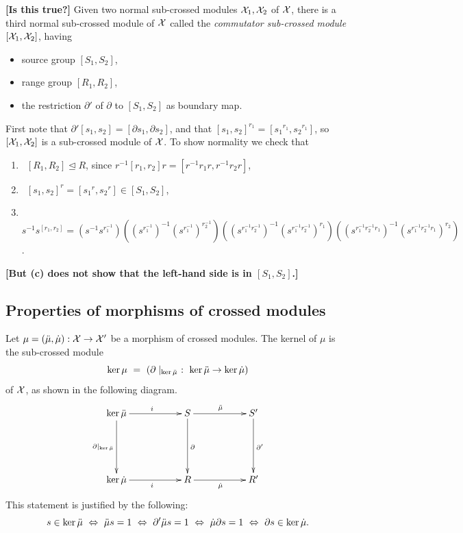 \begin{prop}
{\bf [Is this true?]}\quad
Given two normal sub-crossed modules $\mathcal{X}_1, \mathcal{X}_2$ of $\mathcal{X}$, 
there is a third normal sub-crossed module of $\mathcal{X}$ 
called the \emph{commutator sub-crossed module} 
$[\mathcal{X}_1,\mathcal{X}_2]$, having
\begin{itemize}
\item source group $[S_1,S_2]$,
\item range group $[R_1,R_2]$,
\item the restriction $\partial'$ of $\partial$ to $[S_1,S_2]$ 
as boundary map. 
\end{itemize}
\end{prop}
\begin{pf}
First note that $\partial'[s_1,s_2] = [\partial s_1, \partial s_2]$, 
and that $[s_1,s_2]^{r_1} = [{s_1}^{r_1}, {s_2}^{r_1}]$, 
so $[\mathcal{X}_1,\mathcal{X}_2]$ is a sub-crossed module of $\mathcal{X}$.
To show normality we check that
\begin{enumerate}[{\rm (a)}]
\item ~$[R_1,R_2] \unlhd R$, 
since $r^{-1}[r_1,r_2]r = [r^{-1}r_1r,r^{-1}r_2r]$, 
\item ~$[s_1,s_2]^r = [{s_1}^r,{s_2}^r] \in [S_1,S_2]$,
\item ~$s^{-1}s^{[r_1,r_2]} 
  = (s^{-1}s^{r_1^{-1}})
    ((s^{r_1^{-1}})^{-1}(s^{r_1^{-1}})^{r_2^{-1}})
    ((s^{r_1^{-1}r_2^{-1}})^{-1}(s^{r_1^{-1}r_2^{-1}})^{r_1})
    ((s^{r_1^{-1}r_2^{-1}r_1})^{-1}(s^{r_1^{-1}r_2^{-1}r_1})^{r_2})$.
\end{enumerate}
{\bf [But (c) does not show that the left-hand side is in $[S_1,S_2]$.]}
\end{pf}



\subsection{Properties of morphisms of crossed modules} 
\label{subs:mor-props}

Let $\mu = (\ddot{\mu},\dot{\mu}) : \mathcal{X} \to \mathcal{X}'$  be a morphism of crossed modules.
The kernel of $\mu$ is the sub-crossed module
$$
\ker\mu ~=~ (\partial\mid_{\ker\ddot{\mu}} ~:~ \ker\ddot{\mu} \to \ker\dot{\mu})
$$
of $\mathcal{X}$, as shown in the following diagram.
$$
\xy
\xymatrix{
    \ker\ddm \ar[dd]_{\partial\mid_{\ker\ddm}}
               \ar[rr]^i
    &&    S  \ar[rr]^{\ddm} 
             \ar[dd]^{\partial} 
      &&  S' \ar[dd]^{\partial'}  \\
    &&&& \\
    \ker\dm \ar[rr]_i
    &&    R  \ar[rr]_{\dm}
      &&  R' \\ 
}
\endxy
$$
This statement is justified by the following:
$$
s \in \ker\ddot{\mu} ~\Leftrightarrow~
\ddot{\mu} s = 1 ~\Leftrightarrow~ 
\partial'\ddot{\mu} s = 1 ~\Leftrightarrow~ 
\dot{\mu}\partial s = 1 ~\Leftrightarrow~ 
\partial s \in \ker\dot{\mu}.
$$


